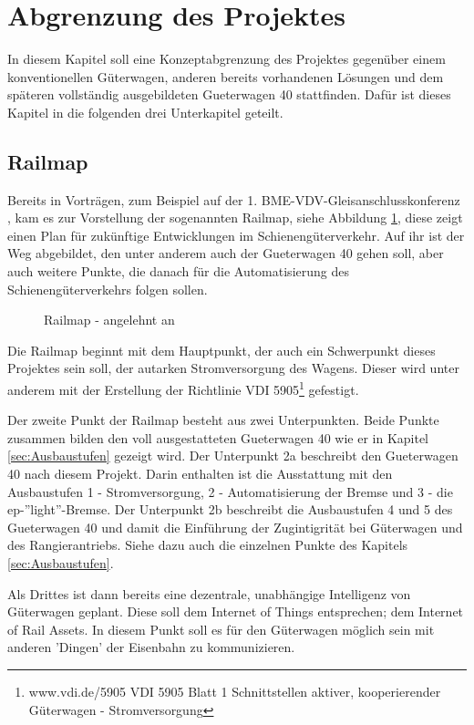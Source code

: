 \section{Abgrenzung des Projektes}
In diesem Kapitel soll eine Konzeptabgrenzung des Projektes gegenüber einem konventionellen Güterwagen, anderen bereits vorhandenen Lösungen und dem späteren vollständig ausgebildeten \gls{Gueterwagen 40} stattfinden. Dafür ist dieses Kapitel in die folgenden drei Unterkapitel geteilt.

\subsection{Railmap}
Bereits in Vorträgen, zum Beispiel auf der 1. BME-VDV-Gleisanschlusskonferenz \cite{GAK}, kam es zur Vorstellung der sogenannten Railmap, siehe Abbildung \ref{fig:Railmap}, diese zeigt einen Plan für zukünftige Entwicklungen im Schienengüterverkehr. Auf ihr ist der Weg abgebildet, den unter anderem auch der \gls{Gueterwagen 40}  gehen soll, aber auch weitere Punkte, die danach für die Automatisierung des Schienengüterverkehrs folgen sollen.\par
\begin{figure}[hbp]
    \centering
    
    \caption{Railmap - angelehnt an \cite{GAK}}
    \label{fig:Railmap}
\end{figure}
Die Railmap beginnt mit dem Hauptpunkt, der auch ein Schwerpunkt dieses Projektes sein soll, der autarken Stromversorgung des Wagens. Dieser wird unter anderem mit der Erstellung der Richtlinie VDI 5905\footnote{www.vdi.de/5905 VDI 5905 Blatt 1 Schnittstellen aktiver, kooperierender Güterwagen - Stromversorgung} gefestigt.\par
Der zweite Punkt der Railmap besteht aus zwei Unterpunkten. Beide Punkte zusammen bilden den voll ausgestatteten \gls{Gueterwagen 40} wie er in Kapitel \ref{sec:Ausbaustufen} gezeigt wird. %
Der Unterpunkt 2a beschreibt den \gls{Gueterwagen 40} nach diesem Projekt. Darin enthalten ist die Ausstattung mit den Ausbaustufen 1 - Stromversorgung, 2 - Automatisierung der Bremse und 3 - die ep-''light''-Bremse. %
Der Unterpunkt 2b beschreibt die Ausbaustufen 4 und 5 des \gls{Gueterwagen 40} und damit die Einführung der Zugintigrität bei Güterwagen und des Rangierantriebs. Siehe dazu auch die einzelnen Punkte des Kapitels \ref{sec:Ausbaustufen}.\par
Als Drittes ist dann bereits eine dezentrale, unabhängige Intelligenz von Güterwagen geplant. Diese soll dem Internet of Things entsprechen; dem Internet of Rail Assets. In diesem Punkt soll es für den Güterwagen möglich sein mit anderen 'Dingen' der Eisenbahn zu kommunizieren.\par
